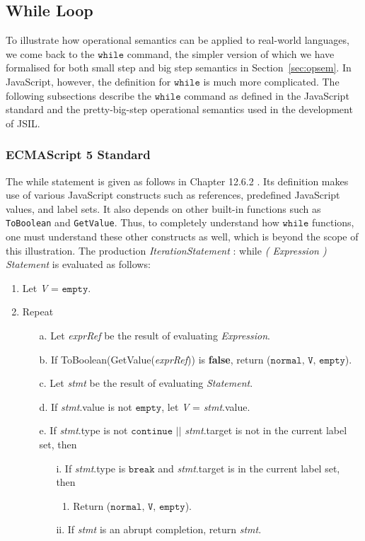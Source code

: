 \documentclass[a4paper,11pt,twoside]{report}
\begin{document}
\subsection{While Loop}
To illustrate how operational semantics can be applied to real-world languages, we come back to the $\mathtt{while}$ command, the simpler version of which we have formalised for both small step and big step semantics in Section~\ref{sec:opsem}. In JavaScript, however, the definition for $\mathtt{while}$ is much more complicated. The following subsections describe the $\mathtt{while}$ command as defined in the JavaScript standard and the pretty-big-step operational semantics used in the development of JSIL.

\subsubsection{ECMAScript 5 Standard} 
The while statement is given as follows in Chapter 12.6.2 \cite{EcmaScript}. Its definition makes use of various JavaScript constructs such as references, predefined JavaScript values, and label sets. It also depends on other built-in functions such as \texttt{ToBoolean} and \texttt{GetValue}. Thus, to completely understand how $\mathtt{while}$ functions, one must understand these other constructs as well, which is beyond the scope of this illustration. The production \textit{IterationStatement} : while \textit{( Expression ) Statement} is evaluated as follows:
\begin{enumerate}
\setlength{\itemsep}{0cm}
\item Let \textit{V} = $\texttt{empty}$.
\item Repeat
\begin{enumerate}
\setlength{\itemsep}{0cm}
\item[a.] Let \textit{exprRef} be the result of evaluating \textit{Expression}.
\item[b.] If ToBoolean(GetValue(\textit{exprRef})) is \textbf{false}, return ($\texttt{normal, {V}, empty}$).
\item[c.] Let \textit{stmt} be the result of evaluating \textit{Statement}.
\item[d.]If \textit{stmt}.value is not $\texttt{empty}$, let \textit{V} = \textit{stmt}.value.
\item[e.]If \textit{stmt}.type is not $\texttt{continue}$ $||$ \textit{stmt}.target is not in the current label set, then
\begin{enumerate}
\item[i.] If \textit{stmt}.type is $\texttt{break}$ and \textit{stmt}.target is in the current label set, then
\begin{enumerate} 
\item Return ($\texttt{normal, {V}, empty}$).
\end{enumerate}
\item[ii.] If \textit{stmt} is an abrupt completion, return \textit{stmt}.
\end{enumerate}
\end{enumerate}
\end{enumerate}
\end{document}
